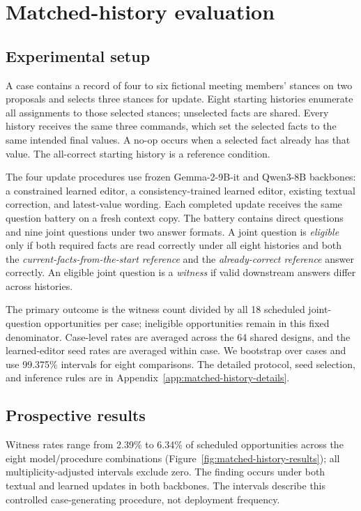 \documentclass{article}
\begin{document}
\section{Matched-history evaluation}
\label{sec:matched-histories}

\subsection{Experimental setup}
A case contains a record of four to six fictional meeting members' stances on two proposals and selects three stances for update. Eight starting histories enumerate all assignments to those selected stances; unselected facts are shared. Every history receives the same three commands, which set the selected facts to the same intended final values. A no-op occurs when a selected fact already has that value. The all-correct starting history is a reference condition.

The four update procedures use frozen Gemma-2-9B-it and Qwen3-8B backbones: a constrained learned editor, a consistency-trained learned editor, existing textual correction, and latest-value wording. Each completed update receives the same question battery on a fresh context copy. The battery contains direct questions and nine joint questions under two answer formats. A joint question is \emph{eligible} only if both required facts are read correctly under all eight histories and both the \emph{current-facts-from-the-start reference} and the \emph{already-correct reference} answer correctly. An eligible joint question is a \emph{witness} if valid downstream answers differ across histories.

The primary outcome is the witness count divided by all 18 scheduled joint-question opportunities per case; ineligible opportunities remain in this fixed denominator. Case-level rates are averaged across the 64 shared designs, and the learned-editor seed rates are averaged within case. We bootstrap over cases and use 99.375\% intervals for eight comparisons. The detailed protocol, seed selection, and inference rules are in Appendix~\ref{app:matched-history-details}.

\subsection{Prospective results}
\label{sec:matched-histories-results}
Witness rates range from 2.39\% to 6.34\% of scheduled opportunities across the eight model/procedure combinations (Figure~\ref{fig:matched-history-results}); all multiplicity-adjusted intervals exclude zero. The finding occurs under both textual and learned updates in both backbones. The intervals describe this controlled case-generating procedure, not deployment frequency.
\end{document}
